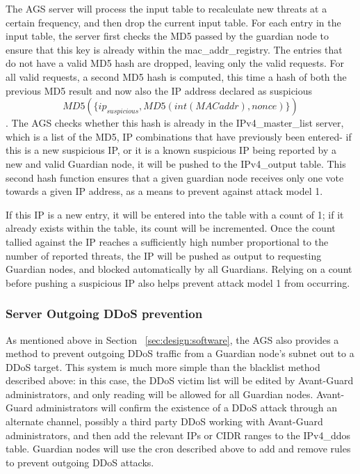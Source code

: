 The AGS server will process the input table to recalculate new threats at a certain frequency, and then drop the current input table. For each entry in the input table, the server first checks the MD5 passed by the guardian node to ensure that this key is already within the mac_addr_registry. The entries that do not have a valid MD5 hash are dropped, leaving only the valid requests. For all valid requests, a second MD5 hash is computed, this time a hash of both the previous MD5 result and now also the IP address declared as suspicious \[MD5(\{ip_{suspicious}, MD5(int(MAC addr), nonce)\}) \]. The AGS checks whether this hash is already in the IPv4_master_list server, which is a list of the MD5, IP combinations that have previously been entered- if this is a new suspicious IP, or it is a known suspicious IP being reported by a new and valid Guardian node, it will be pushed to the IPv4_output table. This second hash function ensures that a given guardian node receives only one vote towards a given IP address, as a means to prevent against attack model 1. 

If this IP is a new entry, it will be entered into the table with a count of 1; if it already exists within the table, its count will be incremented. Once the count tallied against the IP reaches a sufficiently high number proportional to the number of reported threats, the IP will be pushed as output to requesting Guardian nodes, and blocked automatically by all Guardians. Relying on a count before pushing a suspicious IP also helps prevent attack model 1 from occurring. 

\subsubsection{Server Outgoing DDoS prevention}
\label{sec:design:serverddos}

As mentioned above in Section ~\ref{sec:design:software}, the AGS also provides a method to prevent outgoing DDoS traffic from a Guardian node's subnet out to a DDoS target. This system is much more simple than the blacklist method described above: in this case, the DDoS victim list will be edited by Avant-Guard administrators, and only reading will be allowed for all Guardian nodes. Avant-Guard administrators will confirm the existence of a DDoS attack through an alternate channel, possibly a third party DDoS \cite{DDoSPreventionTools} working with Avant-Guard administrators, and then add the relevant IPs or CIDR ranges to the IPv4_ddos table. Guardian nodes will use the cron described above to add and remove rules to prevent outgoing DDoS attacks.